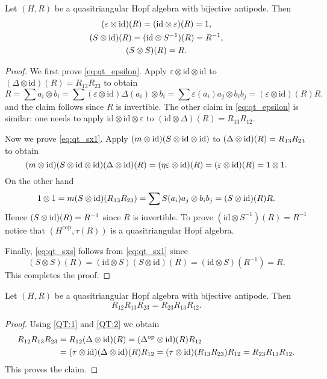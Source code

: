 \begin{proposition}
Let $(H,R)$ be a quasitriangular Hopf algebra with bijective antipode.
Then
\begin{gather}
(\varepsilon\otimes\id)(R)=(\id\otimes\varepsilon)(R)=1,\label{eq:qt_epsilon}\\
(S\otimes\id)(R)=(\id\otimes S^{-1})(R)=R^{-1},\label{eq:qt_sx1}\\
(S\otimes S)(R)=R.\label{eq:qt_sxs}
\end{gather}
\end{proposition}

\begin{proof}
We first prove \eqref{eq:qt_epsilon}. Apply $\varepsilon\otimes\textrm{id}\otimes\textrm{id}$
to $(\Delta\otimes\textrm{id})(R)=R_{13}R_{23}$ to obtain 
\[
R=\sum a_{i}\otimes b_{i}=\sum(\varepsilon\otimes\textrm{id})\Delta(a_{i})\otimes b_{i}=\sum\varepsilon(a_{i})a_{j}\otimes b_{i}b_{j}=(\varepsilon\otimes\textrm{id})(R)R.
\]
and the claim follows since $R$ is invertible. The other claim in
\eqref{eq:qt_epsilon} is similar: one needs to apply
$\textrm{id}\otimes\textrm{id}\otimes\varepsilon$ to
$(\textrm{id}\otimes\Delta)(R)=R_{13}R_{12}$.

Now we prove \eqref{eq:qt_sx1}.  Apply $(m\otimes\mathrm{id})(S\otimes\mathrm{id}\otimes\mathrm{id})$
to $(\Delta\otimes\mathrm{id})(R)=R_{13}R_{23}$ to obtain 
\[
(m\otimes\mathrm{id})(S\otimes\mathrm{id}\otimes\mathrm{id})(\Delta\otimes\mathrm{id})(R)=(\eta\varepsilon\otimes\mathrm{id})(R)=(\varepsilon\otimes\mathrm{id})(R)=1\otimes1.
\]
On the other hand 
\[
1\otimes 1=m(S\otimes\mathrm{id})(R_{13}R_{23})=\sum S(a_{i})a_{j}\otimes b_{i}b_{j}=(S\otimes\mathrm{id})(R)R.
\]
Hence $(S\otimes\mathrm{id})(R)=R^{-1}$ since $R$ is invertible.
To prove $(\textrm{id}\otimes S^{-1})(R)=R^{-1}$ notice that $(H^{\textrm{cop}},\tau(R))$
is a quasitriangular Hopf algebra.

Finally, \eqref{eq:qt_sxs} follows from \eqref{eq:qt_sx1} since
\[
(S\otimes S)(R)=(\textrm{id}\otimes S)(S\otimes\textrm{id})(R)=(\textrm{id}\otimes S)(R^{-1})=R.
\]
This completes the proof.
\end{proof}

\begin{proposition}
\label{proposition:R-matrix}
Let $(H,R)$ be a quasitriangular Hopf algebra
with bijective antipode. Then 
\begin{equation}
R_{12}R_{13}R_{23}=R_{23}R_{13}R_{12}.\label{eq:121323=231312}
\end{equation}
\end{proposition}

\begin{proof}
Using \eqref{QT:1} and \eqref{QT:2} we obtain 
\begin{align*}
R_{12}R_{13}R_{23} & =R_{12}(\Delta\otimes\textrm{id})(R)=(\Delta^{\mathrm{op}}\otimes\mathrm{id})(R)R_{12}\\
 & =(\tau\otimes\mathrm{id})(\Delta\otimes\mathrm{id})(R)R_{12}=(\tau\otimes\mathrm{id})(R_{13}R_{23})R_{12}=R_{23}R_{13}R_{12}.
\end{align*}
This proves the claim.
\end{proof}

